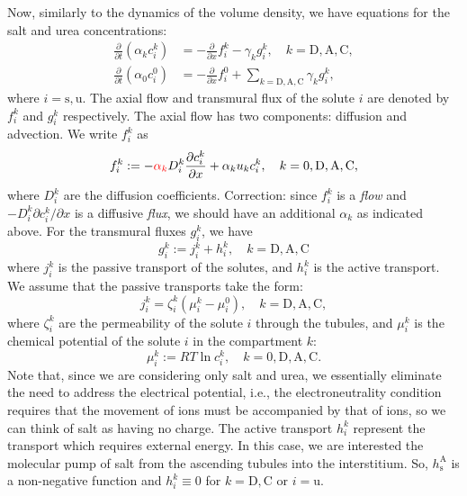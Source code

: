 \documentclass{article}
\begin{document}
Now, similarly to the dynamics of the volume density, we have equations for the salt and urea concentrations:
\begin{align}\label{eq:solute_dynamics}
    \frac{\partial}{\partial t}\left( \alpha_k c_i^k \right)&=-\frac{\partial}{\partial x} f_i^k - \gamma_kg_i^k,\quad k=\mathrm{D},\mathrm{A},\mathrm{C},\\
    \frac{\partial}{\partial t}\left( \alpha_0 c_i^0 \right)&=-\frac{\partial}{\partial x} f_i^0 + \sum_{k=\mathrm{D},\mathrm{A},\mathrm{C}} \gamma_k g_i^k,
\end{align}
    where $i=\mathrm{s},\mathrm{u}$.
The axial flow and transmural flux of the solute $i$ are denoted by $f_i^k$ and $g_i^k$ respectively.
The axial flow has two components: diffusion and advection.
We write $f_i^k$ as
\begin{equation}
    f_i^k := -{\color{red}\alpha_k}D_i^k\frac{\partial c_i^k}{\partial x}+\alpha_ku_kc_i^k,\quad k=0,\mathrm{D},\mathrm{A},\mathrm{C},
\end{equation}
    where $D_i^k$ are the diffusion coefficients.
{\color{red}Correction: since $f_i^k$ is a \textit{flow} and $-D_i^k\partial c_i^k/\partial x$ is a diffusive \textit{flux}, we should have an additional $\alpha_k$ as indicated above.}
For the transmural fluxes $g_i^k$, we have
\begin{equation}
    g_i^k := j_i^k+h_i^k,\quad k=\mathrm{D},\mathrm{A},\mathrm{C}
\end{equation}
    where $j_i^k$ is the passive transport of the solutes, and $h_i^k$ is the active transport.
We assume that the passive transports take the form:
\begin{equation}
    j_i^k = \zeta_i^k\left( \mu_i^k - \mu_i^0 \right),\quad k=\mathrm{D},\mathrm{A},\mathrm{C},
\end{equation}
    where $\zeta_i^k$ are the permeability of the solute $i$ through the tubules, and $\mu_i^k$ is the chemical potential of the solute $i$ in the compartment $k$:
\begin{equation}
    \mu_i^k:= RT\ln c_i^k,\quad k=0,\mathrm{D},\mathrm{A},\mathrm{C}.
\end{equation}
Note that, since we are considering only salt and urea, we essentially eliminate the need to address the electrical potential, i.e., the electroneutrality condition requires that the movement of  ions must be accompanied by that of  ions, so we can think of salt as having no charge.
The active transport $h_i^k$ represent the transport which requires external energy.
In this case, we are interested the molecular pump of salt from the ascending tubules into the interstitium.
So, $h_\mathrm{s}^\mathrm{A}$ is a non-negative function and $h_i^k\equiv 0$ for $k=\mathrm{D},\mathrm{C}$ or $i=\mathrm{u}$.
\end{document}
